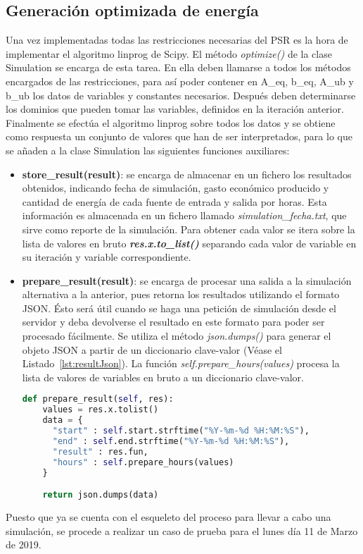 \subsection{Generación optimizada de energía}
Una vez implementadas todas las restricciones necesarias del PSR es la hora de implementar el algoritmo linprog de Scipy. El método \textit{optimize()} de la clase Simulation se encarga de esta tarea. En ella deben llamarse a todos los métodos encargados de las restricciones, para así poder contener en A\_eq, b\_eq, A\_ub y b\_ub los datos de variables y constantes necesarios. Después deben determinarse los dominios que pueden tomar las variables, definidos en la iteración anterior. Finalmente se efectúa el algoritmo linprog sobre todos los datos y se obtiene como respuesta un conjunto de valores que han de ser interpretados, para lo que se añaden a la clase Simulation las siguientes funciones auxiliares:
\begin{itemize}
\item \textbf{store\_result(result)}: se encarga de almacenar en un fichero los resultados obtenidos, indicando fecha de simulación, gasto económico producido y cantidad de energía de cada fuente de entrada y salida por horas. Esta información es almacenada en un fichero llamado \textit{simulation\_fecha.txt}, que sirve como reporte de la simulación. Para obtener cada valor se itera sobre la lista de valores en bruto \textbf{\textit{res.x.to\_list()}} separando cada valor de variable en su iteración y variable correspondiente.
\item \textbf{prepare\_result(result)}: se encarga de procesar una salida a la simulación alternativa a la anterior, pues retorna los resultados utilizando el formato \gls{JSON}. Ésto será útil cuando se haga una petición de simulación desde el servidor y deba devolverse el resultado en este formato para poder ser procesado fácilmente. Se utiliza el método \textit{json.dumps()} para generar el objeto \gls{JSON} a partir de un diccionario clave-valor (Véase el Listado~\ref{lst:resultJson}). La función \textit{self.prepare\_hours(values)} procesa la lista de valores de variables en bruto a un diccionario clave-valor.
\begin{lstlisting}[language=Python,float=ht,caption={Función de procesamiento del resultado a formato json},label={lst:resultJson}]
def prepare_result(self, res):
    values = res.x.tolist()
    data = {
      "start" : self.start.strftime("%Y-%m-%d %H:%M:%S"),
      "end" : self.end.strftime("%Y-%m-%d %H:%M:%S"),
      "result" : res.fun,
      "hours" : self.prepare_hours(values)
    }

    return json.dumps(data)
\end{lstlisting}
\end{itemize}
Puesto que ya se cuenta con el esqueleto del proceso para llevar a cabo una simulación, se procede a realizar un caso de prueba para el lunes día 11 de Marzo de 2019.
